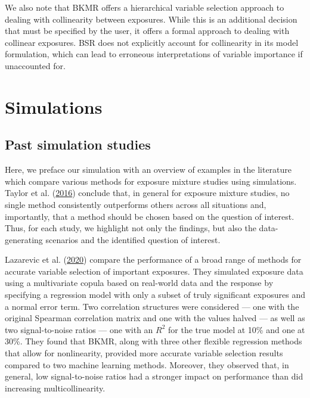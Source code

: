 \documentclass[12pt, twoside]{amherstthesis}
\begin{document}
We also note that BKMR offers a hierarchical variable selection approach to dealing with collinearity between exposures. While this is an additional decision that must be specified by the user, it offers a formal approach to dealing with collinear exposures. BSR does not explicitly account for collinearity in its model formulation, which can lead to erroneous interpretations of variable importance if unaccounted for.

\hypertarget{sims}{%
\chapter{Simulations}\label{sims}}

\hypertarget{past-simulation-studies}{%
\section{Past simulation studies}\label{past-simulation-studies}}

Here, we preface our simulation with an overview of examples in the literature which compare various methods for exposure mixture studies using simulations. Taylor et al. (\protect\hyperlink{ref-taylor_statistical_2016}{2016}) conclude that, in general for exposure mixture studies, no single method consistently outperforms others across all situations and, importantly, that a method should be chosen based on the question of interest. Thus, for each study, we highlight not only the findings, but also the data-generating scenarios and the identified question of interest.

Lazarevic et al. (\protect\hyperlink{ref-lazarevic_performance_2020}{2020}) compare the performance of a broad range of methods for accurate variable selection of important exposures. They simulated exposure data using a multivariate copula based on real-world data and the response by specifying a regression model with only a subset of truly significant exposures and a normal error term. Two correlation structures were considered --- one with the original Spearman correlation matrix and one with the values halved --- as well as two signal-to-noise ratios --- one with an \(R^2\) for the true model at 10\% and one at 30\%. They found that BKMR, along with three other flexible regression methods that allow for nonlinearity, provided more accurate variable selection results compared to two machine learning methods. Moreover, they observed that, in general, low signal-to-noise ratios had a stronger impact on performance than did increasing multicollinearity.
\end{document}
